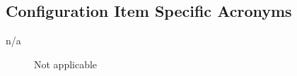 \subsection{Configuration Item Specific Acronyms}\label{subsec:configurationItemSpecificAcronyms}
\begin{description}
\item[n/a] \quad Not applicable
\end{description}